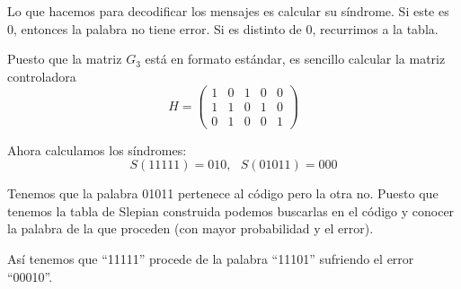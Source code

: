 \begin{problem}[1]
\spart

Lo que hacemos para decodificar los mensajes es calcular su síndrome. Si este es 0, entonces la palabra no tiene error. Si es distinto de 0, recurrimos a la tabla.

Puesto que la matriz $G_3$ está en formato estándar, es sencillo calcular la matriz controladora
\[H = \left(\begin{array}{ccccc}
1 & 0 & 1 & 0 & 0 \\
1 & 1 & 0 & 1 & 0 \\
0 & 1 & 0 & 0 & 1
\end{array}\right)\]

Ahora calculamos los síndromes:
\[S(11111) = 010, \ \ \ S(01011) = 000\]

Tenemos que la palabra 01011 pertenece al código pero la otra no. Puesto que tenemos la tabla de Slepian construida podemos buscarlas en el código y conocer la palabra de la que proceden (con mayor probabilidad y el error).

Así tenemos que ``11111'' procede de la palabra ``11101'' sufriendo el error ``00010''.



\end{problem}

